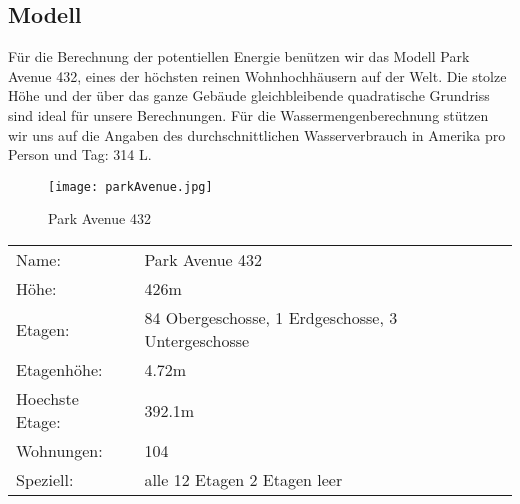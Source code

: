 \subsection{Modell} \label{subsec:modell}

Für die Berechnung der potentiellen Energie benützen wir das Modell Park Avenue 432, eines der höchsten reinen Wohnhochhäusern auf der Welt. Die stolze Höhe und der über das ganze Gebäude gleichbleibende quadratische Grundriss sind ideal für unsere Berechnungen. Für die Wassermengenberechnung stützen wir uns auf die Angaben des durchschnittlichen Wasserverbrauch in Amerika pro Person und Tag: 314 L. \cite{waterUsAmerica}

\begin{figure} [H]
	\centering
	\texttt{[image: parkAvenue.jpg]}
	\caption{Park Avenue 432 \cite{432_Park_Avenue}}
	\label{fig:Park_Avenue_432}
\end{figure}

\begin{table}[H]
\centering
\begin{tabular}{ll}
Name:				& Park Avenue 432\\
Höhe: 				& 426m\\          
Etagen:				& 84 Obergeschosse, 1 Erdgeschosse, 3 Untergeschosse\\
Etagenhöhe:			&4.72m\\
Hoechste Etage:			&392.1m\\
Wohnungen:			&104\\
Speziell:			&alle 12 Etagen 2 Etagen leer\\           
\end{tabular}
\end{table}

\newpage
